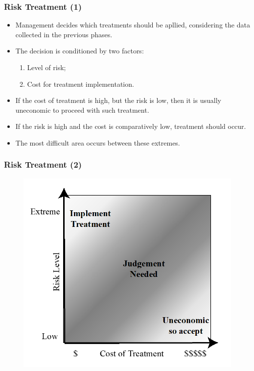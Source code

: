 \documentclass[xcolor ={table,usenames,dvipsnames}]{beamer}
\theoremstyle{definition}
\begin{document}
	\begin{frame}
		\frametitle{Risk Treatment (1)}	
		\begin{itemize}
			\item Management decides which treatments should be apllied, considering the data collected in the previous phases.
			\item The decision is conditioned by two factors:
			\begin{enumerate}
				\item Level of risk;
				\item Cost for treatment implementation.
			\end{enumerate}
			\item If the cost of treatment is high, but the risk is low, then it is usually uneconomic to proceed with such treatment. 
			\item If the risk is high and the cost is comparatively low, treatment should occur. 
			\item The most difficult area occurs between these extremes. 
		\end{itemize}
	\end{frame}

	\begin{frame}
		\frametitle{Risk Treatment (2)}
		\begin{figure}[h!]
			\centering
			\includegraphics[scale=0.55]{img/img_13.PNG}
			\label{Interfacce di un CS}
		\end{figure}
	\end{frame}
	
\end{document}
